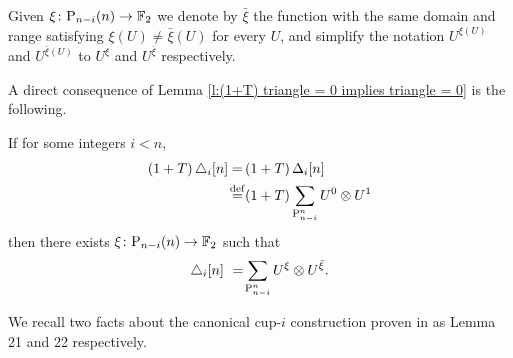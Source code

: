 
\begin{notation}
	Given $\xi \colon \mathrm{P}_{n-i}(n) \to {\mathbb{F}_2}$ we denote by $\bar{\xi}$ the function with the same domain and range satisfying $\xi(U) \neq \bar{\xi}(U)$ for every $U$, and simplify the notation $U^{\xi(U)}$ and $U^{\bar{\xi}(U)}$ to $U^\xi$ and $U^{\bar{\xi}}$ respectively.
\end{notation}


A direct consequence of Lemma \ref{l:(1+T) triangle = 0 implies triangle = 0} is the following.

\begin{lemma}
	If for some integers $i < n$,
	\begin{align*}
	(1+T) \, \triangle_i [n] = \,
	&(1+T) \, \Delta_i [n] \\ \stackrel{\mathrm{def}}{=}
	&(1+T) \sum_{\mathrm{P}_{n-i}^n} {U^0} \otimes {U^1}
	\end{align*}
	then there exists $\xi \colon \mathrm{P}_{n-i}(n) \to {\mathbb{F}_2}$ such that
	\[
	\triangle_i [n]\ =\! \sum_{\mathrm{P}_{n-i}^n} {U^{\xi}} \otimes {U^{\bar{\xi}}}.
	\]
\end{lemma}


We recall two facts about the canonical cup-$i$ construction proven in \cite{medina2021newformulas} as Lemma 21 and 22 respectively.

